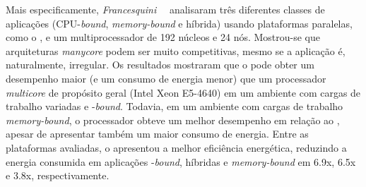 Mais especificamente, \emph{Francesquini}~\etal~\cite{Castro-IA3-JPDC:2014} analisaram
três diferentes classes de aplicações (CPU-\textit{bound}, \textit{memory-bound}
e híbrida) usando plataformas paralelas, como o \mppa, e um multiprocessador \numa de
192 núcleos e 24 nós. Mostrou-se que arquiteturas \textit{manycore} podem ser muito
competitivas, mesmo se a aplicação é, naturalmente, irregular. Os resultados mostraram
que o \mppa pode obter um desempenho maior (e um consumo de energia menor) que um
processador \textit{multicore} de propósito geral (Intel Xeon E5-4640) em um ambiente
com cargas de trabalho variadas e \cpu{}-\textit{bound}. Todavia, em um ambiente com cargas
de trabalho \textit{memory-bound}, o processador \numa obteve um melhor desempenho
em relação ao \mppa, apesar de apresentar também um maior consumo de energia.
Entre as plataformas avaliadas, o \mppa apresentou a melhor eficiência
energética, reduzindo a energia consumida em aplicações \cpu{}-\textit{bound},
híbridas e \textit{memory-bound} em 6.9x, 6.5x e 3.8x, respectivamente.

